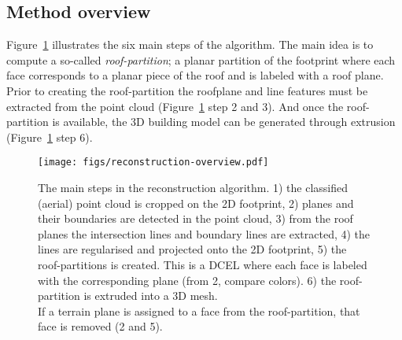 \subsection{Method overview}
Figure~\ref{fig:method-overview} illustrates the six main steps of the algorithm. The main idea is to compute a so-called \emph{roof-partition}; a planar partition of the footprint where each face corresponds to a planar piece of the roof and is labeled with a roof plane. Prior to creating the roof-partition the roofplane and line features must be extracted from the point cloud (Figure~\ref{fig:method-overview} step 2 and 3). And once the roof-partition is available, the 3D building model can be generated through extrusion (Figure~\ref{fig:method-overview} step 6).
\begin{figure}
	\centering
	\texttt{[image: figs/reconstruction-overview.pdf]}
	\caption[The main steps in the reconstruction algorithm]{The main steps in the reconstruction algorithm. 1) the classified (aerial) point cloud is cropped on the 2D footprint, 2) planes and their boundaries are detected in the point cloud, 3) from the roof planes the intersection lines and boundary lines are extracted, 4) the lines are regularised and projected onto the 2D footprint, 5) the roof-partitions is created. This is a DCEL where each face is labeled with the corresponding plane (from 2, compare colors). 6) the roof-partition is extruded into a 3D mesh. \\If a terrain plane is assigned to a face from the roof-partition, that face is removed (2 and 5).}%
	\label{fig:method-overview}
\end{figure}


